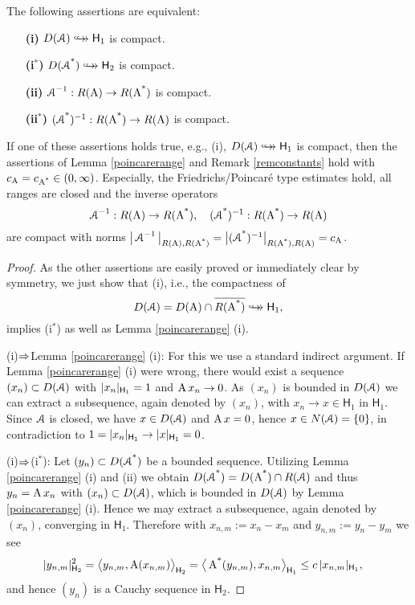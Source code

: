 \documentclass[a4paper]{amsart}
\renewcommand{\H}{\mathsf{H}}
\newcommand{\cptemb}{\hookto\hspace*{-0.85em}\hookto}
\begin{document}
\begin{lem}
The following assertions are equivalent:
\begin{itemize}
\item[\bf(i)]
$D(\cA)\cptemb\hilo$ is compact.
\item[\bf(i${}^{*}$)]
$D(\cAs)\cptemb\hilt$ is compact.
\item[\bf(ii)]
$\operatorname{\mathcal{A}}^{-1}:R(\operatorname{A})\to R(\operatorname{\operatorname{A}^{*}})$ is compact.
\item[\bf(ii${}^{*}$)]
$(\operatorname{\operatorname{\mathcal{A}}^{*}})^{-1}:R(\operatorname{\operatorname{A}^{*}})\to R(\operatorname{A})$ is compact.
\end{itemize}
If one of these assertions holds true, e.g., (i), $D(\cA)\cptemb\hilo$ is compact,
then the assertions of Lemma \ref{poincarerange} and Remark \ref{remconstants} 
hold with $c_{\operatorname{A}}=c_{\operatorname{\operatorname{A}^{*}}}\in(0,\infty)$.
Especially, the Friedrichs/Poincar\'e type estimates hold,
all ranges are closed and the inverse operators 
$$\operatorname{\mathcal{A}}^{-1}:R(\operatorname{A})\to R(\operatorname{\operatorname{A}^{*}}),\quad
(\operatorname{\operatorname{\mathcal{A}}^{*}})^{-1}:R(\operatorname{\operatorname{A}^{*}})\to R(\operatorname{A})$$
are compact with norms 
$\big|\operatorname{\mathcal{A}}^{-1}\big|_{R(\operatorname{A}),R(\operatorname{\operatorname{A}^{*}})}
=\big|(\operatorname{\operatorname{\mathcal{A}}^{*}})^{-1}\big|_{R(\operatorname{\operatorname{A}^{*}}),R(\operatorname{A})}
=c_{\operatorname{A}}$.
\end{lem}

\begin{proof}
As the other assertions are easily proved
or immediately clear by symmetry,
we just show that (i), i.e., the compactness of
$$D(\cA)=D(\A)\cap\ovl{R(\As)}\cptemb\hilo,$$ 
implies (i${}^{*}$) as well as Lemma \ref{poincarerange} (i).

(i)$\Rightarrow$Lemma \ref{poincarerange} (i):
For this we use a standard indirect argument.
If Lemma \ref{poincarerange} (i) were wrong,
there would exist a sequence $(x_{n})\subset D(\operatorname{\mathcal{A}})$ with $\norm{x_{n}}_{\H_{1}}=1$
and $\operatorname{A} x_{n}\to0$. As $(x_{n})$ is bounded in $D(\operatorname{\mathcal{A}})$
we can extract a subsequence, again denoted by $(x_{n})$,
with $x_{n}\to x\in\H_{1}$ in $\H_{1}$. Since $\operatorname{\mathcal{A}}$ is closed,
we have $x\in D(\operatorname{\mathcal{A}})$ and $\operatorname{A} x=0$, hence $x\in N(\operatorname{\mathcal{A}})=\{0\}$, 
in contradiction to $1=\norm{x_{n}}_{\H_{1}}\to\norm{x}_{\H_{1}}=0$.

(i)$\Rightarrow$(i${}^{*}$):
Let $(y_{n})\subset D(\operatorname{\operatorname{\mathcal{A}}^{*}})$ be a bounded sequence.
Utilizing Lemma \ref{poincarerange} (i) and (ii) we obtain
$D(\operatorname{\operatorname{\mathcal{A}}^{*}})=D(\operatorname{\operatorname{A}^{*}})\cap R(\operatorname{\mathcal{A}})$ and thus $y_{n}=\operatorname{A} x_{n}$ 
with $(x_{n})\subset D(\operatorname{\mathcal{A}})$, which is bounded in $D(\operatorname{\mathcal{A}})$ 
by Lemma \ref{poincarerange} (i). Hence we may extract a subsequence,
again denoted by $(x_{n})$, converging in $\H_{1}$. 
Therefore with $x_{n,m}:=x_{n}-x_{m}$ and $y_{n,m}:=y_{n}-y_{m}$ we see
\begin{align*}
\norm{y_{n,m}}_{\H_{2}}^2
&=\bscp{y_{n,m}}{\A(x_{n,m})}_{\H_{2}}
=\bscp{\As(y_{n,m})}{x_{n,m}}_{\H_{1}}
\leq c\,\norm{x_{n,m}}_{\H_{1}},
\end{align*}
and hence $(y_{n})$ is a Cauchy sequence in $\H_{2}$.
\end{proof}
\end{document}
